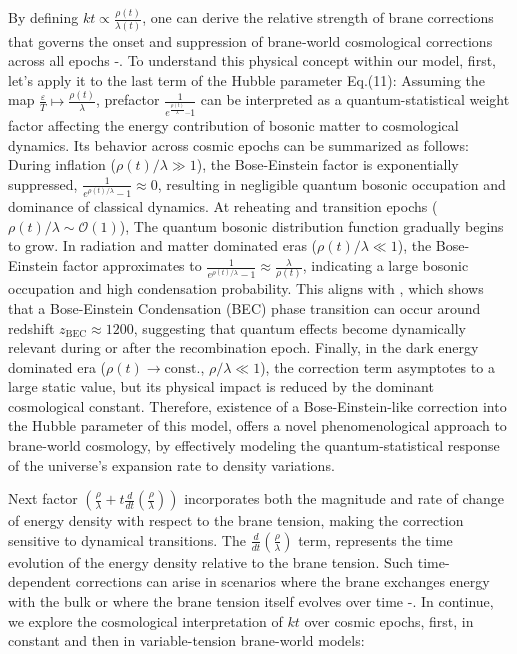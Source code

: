 \documentclass[12pt]{article}  %
\begin{document}
By defining  $kt \propto \frac{\rho(t)}{\lambda(t)}$, one can derive the relative strength of brane corrections that governs the onset and suppression of brane‐world cosmological corrections across all epochs \cite{45}-\cite{46}. To understand this physical concept within our model, first, let's apply it to the last term of the Hubble parameter Eq.(11): 
Assuming the map $\frac{\varepsilon}{T}\mapsto \frac{\rho(t)}{\lambda}$, prefactor $\frac{1}{e^{\frac{\rho(t)}{\lambda}} – 1}$ can be interpreted as a quantum-statistical weight factor affecting the energy contribution of bosonic matter to cosmological dynamics.
Its behavior across cosmic epochs can be summarized as follows: During inflation ($\rho(t)/\lambda \gg 1$), the Bose-Einstein factor is exponentially suppressed,	$\frac{1}{e^{\rho(t)/\lambda} - 1} \approx 0$, resulting in negligible quantum bosonic occupation and dominance of classical dynamics. 
At reheating and transition epochs ($\rho(t)/\lambda \sim \mathcal{O}(1)$), The quantum bosonic distribution function gradually begins to grow. 
In radiation and matter dominated eras ($\rho(t)/\lambda \ll 1$), the Bose-Einstein factor approximates to $\frac{1}{e^{\rho(t)/\lambda} - 1} \approx \frac{\lambda}{\rho(t)}$, indicating a large bosonic occupation and high condensation probability. This aligns with \cite {47}, which shows that a Bose-Einstein Condensation (BEC) phase transition can occur around redshift $z_{\text{BEC}} \approx 1200$, suggesting that quantum effects become dynamically relevant during or after the recombination epoch. 
Finally, in the dark energy dominated era ($\rho(t) \to \text{const.}$, $\rho/\lambda \ll 1$), the correction term asymptotes to a large static value, but its physical impact is reduced by the dominant cosmological constant. 
Therefore, existence of a Bose-Einstein-like correction into the Hubble parameter of this model, offers a novel phenomenological approach to brane-world cosmology, by effectively modeling the quantum-statistical response of the universe's expansion rate to density variations.


Next factor $\left( \frac{\rho}{\lambda} + t \frac{d}{dt} \left( \frac{\rho}{\lambda} \right) \right)$ incorporates both the magnitude and rate of change of energy density with respect to the brane tension, making the correction sensitive to dynamical transitions. The $\frac{d}{dt} (\frac{\rho}{\lambda})$ term, represents the time evolution of the energy density relative to the brane tension. Such time-dependent corrections can arise in scenarios where the brane exchanges energy with the bulk or where the brane tension itself evolves over time \cite{48}-\cite{51}.
In continue, we explore the cosmological interpretation of $kt$ over cosmic epochs, first, in constant and then in variable-tension brane-world models:
\end{document}
